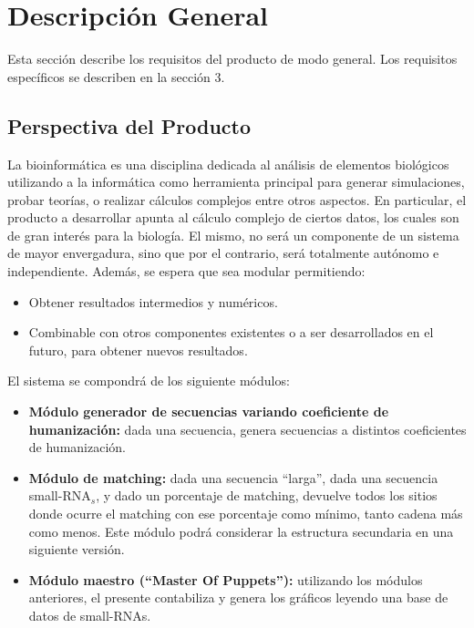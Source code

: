 \documentclass[12pt,a4paper,spanish]{article}
\begin{document}
\section{Descripción General}
\label{section-desc-gral}
Esta sección describe los requisitos del producto de modo general. Los
requisitos específicos se describen en la sección 3.

\subsection{Perspectiva del Producto}
\par La bioinformática es una disciplina dedicada al análisis de elementos biológicos utilizando a la informática como herramienta principal para generar simulaciones, probar teorías, o realizar cálculos complejos entre otros aspectos. En particular, el producto a desarrollar apunta al cálculo complejo de ciertos datos, los cuales son de gran interés para la biología. El mismo, no será un componente de un sistema de mayor envergadura, sino que por el contrario, será totalmente autónomo e independiente. Además, se espera que sea modular permitiendo:
	\begin{itemize} 
		\item Obtener resultados intermedios y numéricos.
		\item Combinable con otros componentes existentes o a ser desarrollados en el futuro, para obtener nuevos resultados.
	\end{itemize}
\par El sistema se compondrá de los siguiente módulos:
	\begin{itemize}
		\item \textbf{Módulo generador de secuencias variando coeficiente de humanización:} dada una secuencia, genera secuencias a distintos coeficientes 																								de humanización. %
		\item \textbf{Módulo de matching:} dada una secuencia ``larga'', dada una secuencia small-RNA$_s$, y dado un porcentaje de matching, devuelve 											   todos los sitios donde ocurre el matching con ese porcentaje como mínimo, tanto cadena más como menos. Este 											   módulo podrá considerar la estructura secundaria en una siguiente versión. %
		\item \textbf{Módulo maestro (“Master Of Puppets”):} utilizando los módulos anteriores, el presente contabiliza y genera los gráficos leyendo una 																base de datos de small-RNAs. %
	\end{itemize}
\end{document}

